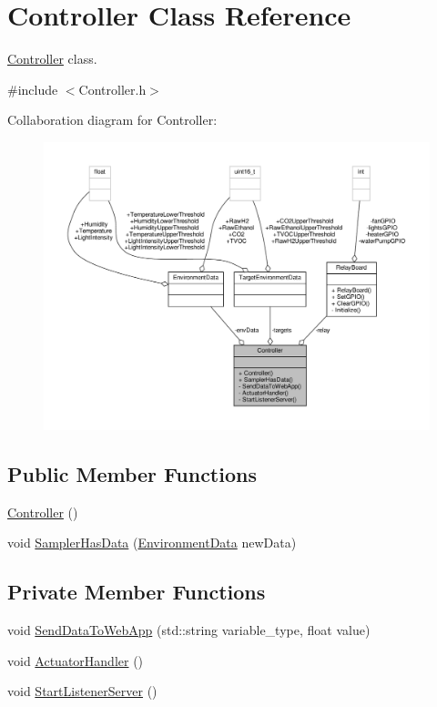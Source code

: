 \hypertarget{classController}{}\section{Controller Class Reference}
\label{classController}


\hyperlink{classController}{Controller} class.  




{\ttfamily \#include $<$Controller.\+h$>$}



Collaboration diagram for Controller\+:\nopagebreak
\begin{figure}[H]
\begin{center}
\leavevmode
\includegraphics[width=350pt]{classController__coll__graph}
\end{center}
\end{figure}
\subsection*{Public Member Functions}
\begin{DoxyCompactItemize}
\item 
\hyperlink{classController_a95c56822d667e94b031451729ce069a9}{Controller} ()
\item 
void \hyperlink{classController_a4b765eaaf8f72e964118967f86c265e2}{Sampler\+Has\+Data} (\hyperlink{structEnvironmentData}{Environment\+Data} new\+Data)
\end{DoxyCompactItemize}
\subsection*{Private Member Functions}
\begin{DoxyCompactItemize}
\item 
void \hyperlink{classController_a9d59ef3807f630a52c964a899a7235dd}{Send\+Data\+To\+Web\+App} (std\+::string variable\+\_\+type, float value)
\item 
void \hyperlink{classController_acd0145853d19eaf3ef9d15f6203ace69}{Actuator\+Handler} ()
\item 
void \hyperlink{classController_a64173dd00be020975d7db533cd280c15}{Start\+Listener\+Server} ()
\end{DoxyCompactItemize}
